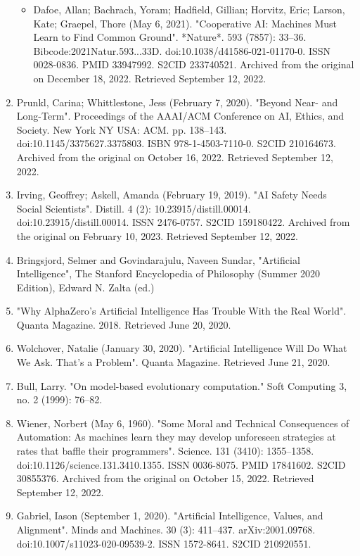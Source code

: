 \begin{enumerate}
\begin{itemize}
\item Dafoe, Allan; Bachrach, Yoram; Hadfield, Gillian; Horvitz, Eric; Larson, Kate; Graepel, Thore (May 6, 2021). "Cooperative AI: Machines Must Learn to Find Common Ground". *Nature*. 593 (7857): 33–36. Bibcode:2021Natur.593...33D. doi:10.1038/d41586-021-01170-0. ISSN 0028-0836. PMID 33947992. S2CID 233740521. Archived from the original on December 18, 2022. Retrieved September 12, 2022.
\end{itemize}
\item Prunkl, Carina; Whittlestone, Jess (February 7, 2020). "Beyond Near- and Long-Term". Proceedings of the AAAI/ACM Conference on AI, Ethics, and Society. New York NY USA: ACM. pp. 138–143. doi:10.1145/3375627.3375803. ISBN 978-1-4503-7110-0. S2CID 210164673. Archived from the original on October 16, 2022. Retrieved September 12, 2022.
\item Irving, Geoffrey; Askell, Amanda (February 19, 2019). "AI Safety Needs Social Scientists". Distill. 4 (2): 10.23915/distill.00014. doi:10.23915/distill.00014. ISSN 2476-0757. S2CID 159180422. Archived from the original on February 10, 2023. Retrieved September 12, 2022.
\item Bringsjord, Selmer and Govindarajulu, Naveen Sundar, "Artificial Intelligence", The Stanford Encyclopedia of Philosophy (Summer 2020 Edition), Edward N. Zalta (ed.)
\item "Why AlphaZero's Artificial Intelligence Has Trouble With the Real World". Quanta Magazine. 2018. Retrieved June 20, 2020.
\item Wolchover, Natalie (January 30, 2020). "Artificial Intelligence Will Do What We Ask. That's a Problem". Quanta Magazine. Retrieved June 21, 2020.
\item Bull, Larry. "On model-based evolutionary computation." Soft Computing 3, no. 2 (1999): 76–82.
\item Wiener, Norbert (May 6, 1960). "Some Moral and Technical Consequences of Automation: As machines learn they may develop unforeseen strategies at rates that baffle their programmers". Science. 131 (3410): 1355–1358. doi:10.1126/science.131.3410.1355. ISSN 0036-8075. PMID 17841602. S2CID 30855376. Archived from the original on October 15, 2022. Retrieved September 12, 2022.
\item Gabriel, Iason (September 1, 2020). "Artificial Intelligence, Values, and Alignment". Minds and Machines. 30 (3): 411–437. arXiv:2001.09768. doi:10.1007/s11023-020-09539-2. ISSN 1572-8641. S2CID 210920551.

\end{enumerate}
